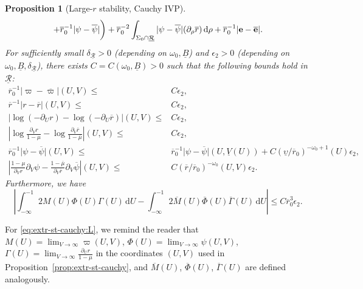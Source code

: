 \documentclass[10pt, reqno]{amsart}
\newtheorem{proposition}[theorem]{Proposition}
\theoremstyle{definition}
\theoremstyle{remark}
\theoremstyle{conjecture}
\numberwithin{equation}{section}
\newcommand{\abs}[1]{\vert#1\vert}
\newcommand{\ud}{\mathrm{d}}
\newcommand{\rd}{\partial}
\newcommand{\0}{\emptyset}
\newcommand{\Gmm}{\Gamma}
\newcommand{\dlt}{\delta}
\newcommand{\eps}{\epsilon}
\newcommand{\Sgm}{\Sigma}
\newcommand{\omg}{\omega}
\newcommand{\ups}{\upsilon}
\newcommand{\bfe}{{\bf e}}
\newcommand{\calR}{\mathcal R}
\newcommand{\e}{\bfe}							%
\newcommand{\psibg}{\overline{\psi}}				%
\newcommand{\rbg}{\overline{r}}					%
\newcommand{\varpibg}{\overline{\varpi}}				%
\newcommand{\mubg}{\overline{\mu}}				%
\newcommand{\ebg}{\overline{\e}}					%
\newcommand{\Abs}[1]{\left\vert #1 \right\vert}
\begin{document}
\begin{proposition}[Large-$r$ stability, Cauchy IVP]
\begin{align*}
	+ \rbg_{0}^{-1} \abs{\psi - \psibg} \bigg)
	+ \rbg_{0}^{-2} \int_{\Sgm_{0} \cap \underline{\calR}} \abs{\psi - \psibg} (\rd_{\rho} \rbg) \, \ud \rho 
	+ \rbg_{0}^{-1} \abs{\e - \ebg}.
\end{align*}
For sufficiently small $\dlt_{\underline{\calR}} > 0$ (depending on $\omg_0, \underline{B}$) and $\eps_{2} > 0$ (depending on $\omg_0, \underline{B}, \dlt_{\underline{\calR}}$), there exists $C = C(\omg_0, \underline{B}) > 0$ such that the following bounds hold in $\underline{\calR}$:
\begin{equation} \label{eq:extr-st-cauchy}
\begin{aligned}
	\rbg_{0}^{-1} \abs{\varpi - \varpibg} (U, V) \leq & C \eps_{2}, \\
	\rbg^{-1} \abs{r - \rbg} (U, V) \leq & C \eps_{2}, \\
	\Abs{\log (-\rd_{U} r) - \log (- \rd_{U} \rbg)} (U, V)  \leq & C \eps_{2}, \\
	\Abs{\log \frac{\rd_{V} r}{1-\mu}- \log \frac{\rd_{V} \rbg}{1-\mubg}} (U, V) \leq & C \eps_{2}, \\
	\rbg_{0}^{-1} \abs{\psi - \psibg} (U, V) \leq & \rbg_{0}^{-1} \abs{\psi - \psibg} (U, \underline{V}(U))+ C (\underline{\ups} / \rbg_{0})^{-\omg_0+1} (U) \eps_{2}, \\
	\Abs{\frac{1-\mu}{\rd_{V} r} \rd_{V} \psi - \frac{1-\mubg}{\rd_{V} \rbg} \rd_{V} \psibg} (U, V)\leq & C (\rbg / \rbg_{0})^{-\omg_0} (U, V) \eps_{2} .	
\end{aligned}
\end{equation}
Furthermore, we have
\begin{equation} \label{eq:extr-st-cauchy:L}
	\Abs{\int_{-\infty}^{-1} 2 M(U) \Phi(U) \Gmm(U) \, \ud U - \int_{-\infty}^{-1} 2 \overline{M}(U) \overline{\Phi}(U) \overline{\Gmm}(U) \, \ud U} \leq C \rbg_{0}^{3} \eps_{2}.
\end{equation}
\end{proposition}
For \eqref{eq:extr-st-cauchy:L}, we remind the reader that $M(U) = \lim_{V \to \infty} \varpi(U, V)$, $\Phi(U) = \lim_{V \to \infty} \psi(U, V)$, $\Gmm(U) = \lim_{V \to \infty} \frac{\rd_{U} r}{1-\mu}$ in the coordinates $(U, V)$ used in Proposition~\ref{prop:extr-st-cauchy}, and $\overline{M} (U)$, $\overline{\Phi}(U)$, $\overline{\Gmm}(U)$ are defined analogously.
\end{document}
